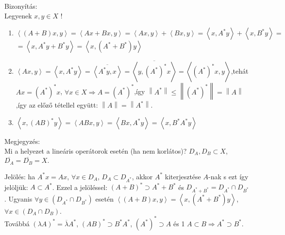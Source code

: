 \documentclass[12pt,a4paper]{scrartcl}
\providecommand{\tightlist}{%
  \setlength{\itemsep}{0pt}\setlength{\parskip}{0pt}}
\newenvironment{bizonyitas}{}{}
\newenvironment{megjegyzes}{}{}
\begin{document}
\begin{bizonyitas}

Bizonyítás:\\
Legyenek \(x,y \in X\) !

\begin{enumerate}
\def\labelenumi{\arabic{enumi}.}
\tightlist
\item
  \(\left\langle {\left( {A + B} \right)x,y} \right\rangle = \left\langle {Ax + Bx,y} \right\rangle = \left\langle {Ax,y} \right\rangle + \left\langle {Bx,y} \right\rangle = \left\langle {x,A^{*}y} \right\rangle + \left\langle {x,B^{*}y} \right\rangle =\)
  \(= \left\langle {x,A^{*}y + B^{*}y} \right\rangle = \left\langle {x,\left( {A^{*} + B^{*}} \right)y} \right\rangle\)
\item
  \(\left\langle {Ax,y} \right\rangle = \left\langle {x,A^{*}y} \right\rangle = \overline{\left\langle {A^{*}y,x} \right\rangle} = \overline{\left\langle {y,\left( A^{*} \right)^{*}x} \right\rangle} = \left\langle {\left( A^{*} \right)^{*}x,y} \right\rangle\),tehát
  \(Ax = \left( A^{*} \right)^{*}x\),
  \(\left. \forall x \in X\Rightarrow A = \left( A^{*} \right)^{*} \right.\),így
  \(\left\| A^{*} \right\| \leq \left\| \left( A^{*} \right)^{*} \right\| = \left\| A \right\|\),így
  az előző tétellel együtt:
  \(\left\| A \right\| = \left\| A^{*} \right\|\).
\item
  \(\left\langle {x,\left( {AB} \right)^{*}y} \right\rangle = \left\langle {ABx,y} \right\rangle = \left\langle {Bx,A^{*}y} \right\rangle = \left\langle {x,B^{*}A^{*}y} \right\rangle\)
\end{enumerate}

\end{bizonyitas}

\begin{megjegyzes}

Megjegyzés:\\
Mi a helyezet a lineáris operátorok esetén (ha nem korlátos)?
\(D_{A},D_{B} \subset X\), \(\overline{D_{A}} = \overline{D_{B}} = X\).

\end{megjegyzes}

Jelölés: ha \(A^{*}x = Ax\), \(\forall x \in D_{A}\),
\(D_{A} \subset D_{A^{*}}\), akkor \(A^{*}\) kiterjesztése \(A\)-nak s
ezt így jelöljük: \(A \subset A^{*}\). Ezzel a jelöléssel:
\(\left( {A + B} \right)^{*} \supset A^{*} + B^{*}\) és
\(D_{A^{*} + B^{*}} = D_{A^{*}} \cap D_{B^{*}}\). Ugyanis
\(\forall y \in \left( {D_{A^{*}} \cap D_{B^{*}}} \right)\) esetén
\(\left\langle {\left( {A + B} \right)x,y} \right\rangle = \left\langle {x,\left( {A^{*} + B^{*}} \right)y} \right\rangle\),
\(\forall x \in \left( {D_{A} \cap D_{B}} \right)\).\\
Továbbá \(\left( {\lambda A} \right)^{*} = \overline{\lambda}A^{*}\),
\(\left( {AB} \right)^{*} \supset B^{*}A^{*}\),
\(\left( A^{*} \right)^{*} \supset A\) és 1
\(\left. A \subset B\Rightarrow A^{*} \supset B^{*} \right.\).
\end{document}
